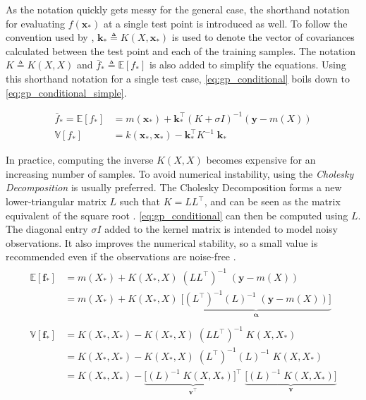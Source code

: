As the notation quickly gets messy for the general case, the shorthand notation for evaluating $f(\boldsymbol{x}_*)$ at a single test point is introduced as well. To follow the convention used by \cite{rasmussen}, $\boldsymbol{k}_* \triangleq K(X, \boldsymbol{x}_*)$ is used to denote the vector of covariances calculated between the test point and each of the training samples. The notation $K \triangleq K(X, X)$ and $\bar{f}_* \triangleq \mathbb{E}[f_*]$ is also added to simplify the equations. Using this shorthand notation for a single test case, \cref{eq:gp_conditional} boils down to \cref{eq:gp_conditional_simple}.

\begin{subequations}\label{eq:gp_conditional_simple}
\begin{align}
    \bar{f}_* = \mathbb{E}[f_*]  &= m(\boldsymbol{x}_*) + \boldsymbol{k}_*^\intercal ( K + \sigma I)^{-1} (\boldsymbol{y} - m(X))\\
    \mathbb{V}[f_*] &= k(\boldsymbol{x}_*, \boldsymbol{x}_*) - \boldsymbol{k}_*^\intercal K^{-1} \; \boldsymbol{k}_*\label{eq:gp_conditional_var_simple}
\end{align}
\end{subequations}

In practice, computing the inverse $K(X, X)$ becomes expensive for an increasing number of samples. To avoid numerical instability, using the \textit{Cholesky Decomposition} is usually preferred. The Cholesky Decomposition forms a new lower-triangular matrix $L$ such that $K = L L^\intercal$, and can be seen as the matrix equivalent of the square root . \cref{eq:gp_conditional} can then be computed using $L$. The diagonal entry $\sigma I$ added to the kernel matrix is intended to model noisy observations. It also improves the numerical stability, so a small value is recommended even if the observations are noise-free \cite{scikit-learn}.
\begin{subequations}
\begin{align}
    \begin{split}
    \mathbb{E}[{\boldsymbol{f}}_*] &= m(X_*) + K(X_*, X) \; (L L^\intercal)^{-1} \; (\boldsymbol{y} - m(X))\\ &= m(X_*) + K(X_*, X) \; \underbrace{\big[(L^\intercal)^{-1} (L)^{-1}  \; (\boldsymbol{y} - m(X))\big]}_{\boldsymbol{\alpha}}
    \end{split}\\
    \begin{split}
    \mathbb{V}[\boldsymbol{f}_*] &= K(X_*, X_*) - K(X_*, X) \; (L L^\intercal)^{-1} \; K(X, X_*)\\
    &= K(X_*, X_*) - K(X_*, X) \; (L^\intercal)^{-1} (L)^{-1} \; K(X, X_*)\\
    &= K(X_*, X_*) - \underbrace{\big[(L)^{-1} \; K(X, X_*)\big]^\intercal}_{\boldsymbol{v^\intercal}} \; \underbrace{\big[(L)^{-1} \; K(X, X_*)\big]}_{\boldsymbol{v}}
    \end{split}
\end{align}
\end{subequations}

